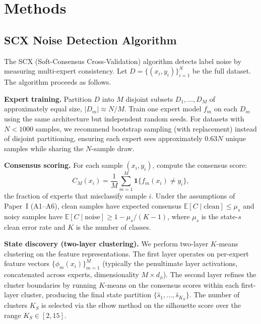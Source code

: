 
\section{Methods}

\subsection{SCX Noise Detection Algorithm}

The SCX (Soft-Consensus Cross-Validation) algorithm detects label noise by measuring multi-expert consistency. Let $D = \{(x_i, y_i)\}_{i=1}^N$ be the full dataset. The algorithm proceeds as follows.

\textbf{Expert training.} Partition $D$ into $M$ disjoint subsets $D_1, \dots, D_M$ of approximately equal size, $|D_m| \approx N/M$. Train one expert model $f_m$ on each $D_m$ using the same architecture but independent random seeds. For datasets with $N < 1000$ samples, we recommend bootstrap sampling (with replacement) instead of disjoint partitioning, ensuring each expert sees approximately $0.63N$ unique samples while sharing the $N$-sample draw.

\textbf{Consensus scoring.} For each sample $(x_i, y_i)$, compute the consensus score:
\begin{equation}
C_M(x_i) = \frac{1}{M} \sum_{m=1}^M \mathbf{1}\{f_m(x_i) \neq y_i\},
\end{equation}
the fraction of experts that misclassify sample $i$. Under the assumptions of Paper~I (A1--A6), clean samples have expected consensus $\mathbb{E}[C \mid \text{clean}] \leq \mu_s$ and noisy samples have $\mathbb{E}[C \mid \text{noise}] \geq 1 - \mu_s/(K-1)$, where $\mu_s$ is the state-$s$ clean error rate and $K$ is the number of classes.

\textbf{State discovery (two-layer clustering).} We perform two-layer $K$-means clustering on the feature representations. The first layer operates on per-expert feature vectors $\{\phi_m(x_i)\}_{m=1}^M$ (typically the penultimate layer activations, concatenated across experts, dimensionality $M \times d_\phi$). The second layer refines the cluster boundaries by running $K$-means on the consensus scores within each first-layer cluster, producing the final state partition $\{\hat{s}_1, \dots, \hat{s}_{K_S}\}$. The number of clusters $K_S$ is selected via the elbow method on the silhouette score over the range $K_S \in [2, 15]$.

